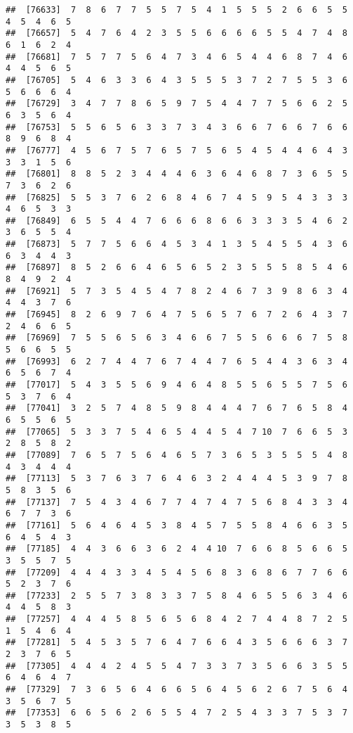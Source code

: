 \documentclass[
]{book}
\begin{document}
\begin{verbatim}
##  [76633]  7  8  6  7  7  5  5  7  5  4  1  5  5  5  2  6  6  5  5  4  5  4  6  5
##  [76657]  5  4  7  6  4  2  3  5  5  6  6  6  6  5  5  4  7  4  8  6  1  6  2  4
##  [76681]  7  5  7  7  5  6  4  7  3  4  6  5  4  4  6  8  7  4  6  4  4  5  6  5
##  [76705]  5  4  6  3  3  6  4  3  5  5  5  3  7  2  7  5  5  3  6  5  6  6  6  4
##  [76729]  3  4  7  7  8  6  5  9  7  5  4  4  7  7  5  6  6  2  5  6  3  5  6  4
##  [76753]  5  5  6  5  6  3  3  7  3  4  3  6  6  7  6  6  7  6  6  8  9  6  8  4
##  [76777]  4  5  6  7  5  7  6  5  7  5  6  5  4  5  4  4  6  4  3  3  3  1  5  6
##  [76801]  8  8  5  2  3  4  4  4  6  3  6  4  6  8  7  3  6  5  5  7  3  6  2  6
##  [76825]  5  5  3  7  6  2  6  8  4  6  7  4  5  9  5  4  3  3  3  4  6  5  3  3
##  [76849]  6  5  5  4  4  7  6  6  6  8  6  6  3  3  3  5  4  6  2  3  6  5  5  4
##  [76873]  5  7  7  5  6  6  4  5  3  4  1  3  5  4  5  5  4  3  6  6  3  4  4  3
##  [76897]  8  5  2  6  6  4  6  5  6  5  2  3  5  5  5  8  5  4  6  8  4  9  2  4
##  [76921]  5  7  3  5  4  5  4  7  8  2  4  6  7  3  9  8  6  3  4  4  4  3  7  6
##  [76945]  8  2  6  9  7  6  4  7  5  6  5  7  6  7  2  6  4  3  7  2  4  6  6  5
##  [76969]  7  5  5  6  5  6  3  4  6  6  7  5  5  6  6  6  7  5  8  5  6  6  5  5
##  [76993]  6  2  7  4  4  7  6  7  4  4  7  6  5  4  4  3  6  3  4  6  5  6  7  4
##  [77017]  5  4  3  5  5  6  9  4  6  4  8  5  5  6  5  5  7  5  6  5  3  7  6  4
##  [77041]  3  2  5  7  4  8  5  9  8  4  4  4  7  6  7  6  5  8  4  6  5  5  6  5
##  [77065]  5  3  3  7  5  4  6  5  4  4  5  4  7 10  7  6  6  5  3  2  8  5  8  2
##  [77089]  7  6  5  7  5  6  4  6  5  7  3  6  5  3  5  5  5  4  8  4  3  4  4  4
##  [77113]  5  3  7  6  3  7  6  4  6  3  2  4  4  4  5  3  9  7  8  5  8  3  5  6
##  [77137]  7  5  4  3  4  6  7  7  4  7  4  7  5  6  8  4  3  3  4  6  7  7  3  6
##  [77161]  5  6  4  6  4  5  3  8  4  5  7  5  5  8  4  6  6  3  5  6  4  5  4  3
##  [77185]  4  4  3  6  6  3  6  2  4  4 10  7  6  6  8  5  6  6  5  3  5  5  7  5
##  [77209]  4  4  4  3  3  4  5  4  5  6  8  3  6  8  6  7  7  6  6  5  2  3  7  6
##  [77233]  2  5  5  7  3  8  3  3  7  5  8  4  6  5  5  6  3  4  6  4  4  5  8  3
##  [77257]  4  4  4  5  8  5  6  5  6  8  4  2  7  4  4  8  7  2  5  1  5  4  6  4
##  [77281]  5  4  5  3  5  7  6  4  7  6  6  4  3  5  6  6  6  3  7  2  3  7  6  5
##  [77305]  4  4  4  2  4  5  5  4  7  3  3  7  3  5  6  6  3  5  5  6  4  6  4  7
##  [77329]  7  3  6  5  6  4  6  6  5  6  4  5  6  2  6  7  5  6  4  3  5  6  7  5
##  [77353]  6  6  5  6  2  6  5  5  4  7  2  5  4  3  3  7  5  3  7  3  5  3  8  5

\end{verbatim}
\end{document}
